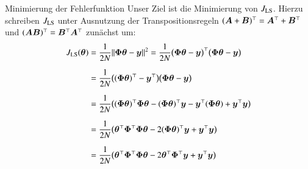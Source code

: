 \begin{frame}{Minimierung der Fehlerfunktion}{}
	Unser Ziel ist die Minimierung von $J_{\text{LS}}$. Hierzu schreiben $J_{\text{LS}}$ unter Ausnutzung der Transpositionsregeln
	$(\bm{A} + \bm{B})^\top = \bm{A}^\top + \bm{B}^\top$ und $(\bm{A} \bm{B})^\top = \bm{B}^\top \bm{A}^\top$ zunächst um:
	\begin{align*}
		J_{\text{LS}}(\bm{\theta})
			&= \frac{1}{2N} \Vert \bm{\Phi} \bm{\theta} - \bm{y} \Vert^2
				= \frac{1}{2N} \bigl( \bm{\Phi} \bm{\theta} - \bm{y} \bigr)^\top \bigl( \bm{\Phi} \bm{\theta} - \bm{y} \bigr)
	\\[2mm]
			&= \frac{1}{2N} \bigl( (\bm{\Phi} \bm{\theta})^\top - \bm{y}^\top \bigr) \bigl( \bm{\Phi} \bm{\theta} - \bm{y} \bigr)
	\\[2mm]
			&= \frac{1}{2N} \bigl( (\bm{\Phi} \bm{\theta})^\top \bm{\Phi} \bm{\theta} - (\bm{\Phi} \bm{\theta})^\top \bm{y} - \bm{y}^\top (\bm{\Phi} \bm{\theta}) + \bm{y}^\top \bm{y} \bigr)
	\\[2mm]
			&= \frac{1}{2N} \bigl( \bm{\theta}^\top \bm{\Phi}^\top \bm{\Phi} \bm{\theta} - 2 (\bm{\Phi} \bm{\theta})^\top \bm{y} + \bm{y}^\top \bm{y} \bigr)
	\\[2mm]
			&= \frac{1}{2N} \bigl( \bm{\theta}^\top \bm{\Phi}^\top \bm{\Phi} \bm{\theta} - 2 \bm{\theta}^\top \bm{\Phi}^\top \bm{y} + \bm{y}^\top \bm{y} \bigr)
	\end{align*}
\end{frame}


